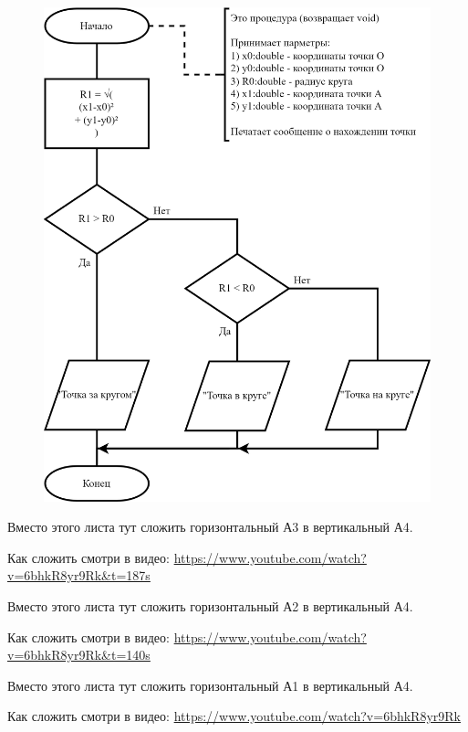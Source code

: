 \documentclass[12pt, a4paper, simple]{eskdtext}
\begin{document}


\begin{figure}[!h]
    \centering
    \includegraphics[]
    {../sources/flowcharts/5.png}
\end{figure}

\newpage

Вместо этого листа тут сложить горизонтальный А3 в вертикальный А4.

Как сложить смотри в видео:
\url{https://www.youtube.com/watch?v=6bhkR8yr9Rk&t=187s}

\newpage

Вместо этого листа тут сложить горизонтальный А2 в вертикальный А4.

Как сложить смотри в видео:
\url{https://www.youtube.com/watch?v=6bhkR8yr9Rk&t=140s}

\newpage

Вместо этого листа тут сложить горизонтальный А1 в вертикальный А4.

Как сложить смотри в видео:
\url{https://www.youtube.com/watch?v=6bhkR8yr9Rk}
\end{document}

